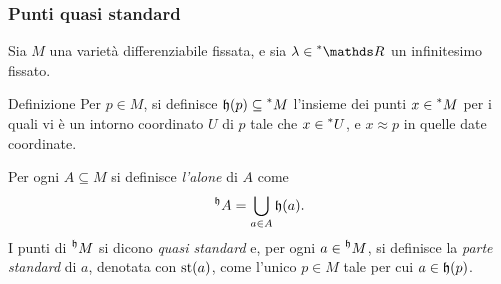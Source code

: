 \documentclass{beamer}
\newenvironment{definizioneb}{\begin{block}{Definizione}}{\end{block}}
\newenvironment{teoremab}{\begin{alertblock}{Teorema}}{\end{alertblock}}
\begin{document}
    




\begin{frame}
    \frametitle{Punti quasi standard}

    Sia $ M $ una varietà differenziabile fissata, e sia $\lambda \in \starR$ un infinitesimo fissato. 

    \begin{definizioneb}
        Per $ p \in M $, si definisce $ \mathfrak{h}(p) \subseteq \prescript{*}{}{M} $ l'insieme dei punti $ x \in \prescript{*}{}{M} $ per i quali vi è un intorno coordinato $ U $ di $ p $ tale che $ x \in \prescript{*}{}{U} $, e $ x \approx p $ in quelle date coordinate.
    \end{definizioneb}

    Per ogni $ A \subseteq M $ si definisce \emph{l'alone} di $ A $ come \begin{equation*}
        \prescript{\mathfrak{h}}{}{A} = \bigcup_{a \in A}\mathfrak{h}(a). 
    \end{equation*}I punti di $ \prescript{\mathfrak{h}}{}{M} $ si dicono \emph{quasi standard} e, per ogni $ a \in \prescript{\mathfrak{h}}{}{M} $, si definisce la \emph{parte standard} di $ a $, denotata con $ \operatorname{st}(a) $, come l'unico $ p \in M $ tale per cui $ a \in \mathfrak{h}(p) $. 

\end{frame}
\end{document}
